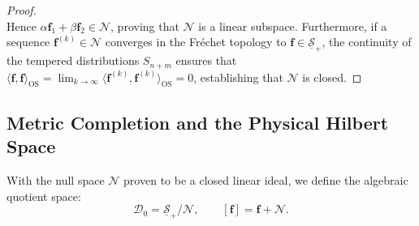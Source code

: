 \begin{proof}
\begin{equation}
\end{equation}
Hence $\alpha \mathbf{f}_1 + \beta \mathbf{f}_2 \in \mathcal{N}$, proving that $\mathcal{N}$ is a linear subspace. Furthermore, if a sequence $\mathbf{f}^{(k)} \in \mathcal{N}$ converges in the Fr\'echet topology to $\mathbf{f} \in \underline{\mathcal{S}}_+$, the continuity of the tempered distributions $S_{n+m}$ ensures that $\langle \mathbf{f}, \mathbf{f} \rangle_{\mathrm{OS}} = \lim_{k \to \infty} \langle \mathbf{f}^{(k)}, \mathbf{f}^{(k)} \rangle_{\mathrm{OS}} = 0$, establishing that $\mathcal{N}$ is closed.
\end{proof}

\subsection{Metric Completion and the Physical Hilbert Space}
\label{subsec:hilbert_space_metric_completion}

With the null space $\mathcal{N}$ proven to be a closed linear ideal, we define the algebraic quotient space:
\begin{equation}
\mathcal{D}_0 = \underline{\mathcal{S}}_+ / \mathcal{N}, \qquad [\mathbf{f}] = \mathbf{f} + \mathcal{N}.
\end{equation}

